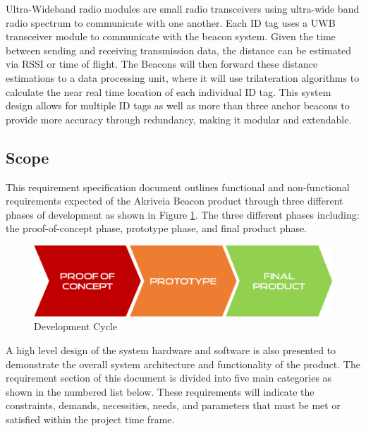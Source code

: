 \bigskip
Ultra-Wideband radio modules are small radio transceivers using ultra-wide band radio spectrum to communicate with one another. Each ID tag uses a UWB transceiver module to communicate with the beacon system. Given the time between sending and receiving transmission data, the distance can be estimated via \Gls{RSSI} or time of flight. The Beacons will then forward these distance estimations to a data processing unit, where it will use trilateration algorithms to calculate the near real time location of each individual ID tag. This system design allows for multiple ID tags as well as more than three anchor beacons to provide more accuracy through redundancy, making it modular and extendable.

\break

\subsection{Scope}
This requirement specification document outlines functional and non-functional requirements expected of the Akriveia Beacon product through three different phases of development as shown in Figure \ref{dev}. The three different phases including: the proof-of-concept phase, prototype phase, and final product phase.
\medskip

\begin{figure}[H]
\centering
    \includegraphics[scale=0.4]{./images/dev-path.png}
    \caption{Development Cycle}
    \label{dev}
\end{figure}

A high level design of the system hardware and software is also presented to demonstrate the overall system architecture and functionality of the product. The requirement section of this document is divided into five main categories as shown in the numbered list below. These requirements will indicate the constraints, demands, necessities, needs, and parameters that must be met or satisfied within the project time frame.

